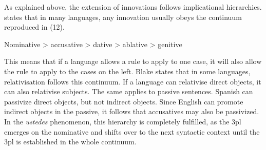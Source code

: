 \documentclass[output=paper]{LSP/langsci}
\begin{document}
\begin{table}
\label{tab:10}
\caption{Extension of the innovative 3pl in the \textit{ustedes} phenomenon} 
\end{table}

As explained above, the extension of innovations follows implicational hierarchies. \citet{blake_case_2004} states that in many languages, any innovation usually obeys the continuum reproduced in (12).

\begin{exe}
\ex Nominative {\textgreater} accusative {\textgreater} dative {\textgreater} ablative {\textgreater} genitive
\end{exe}

This means that if a language allows a rule to apply to one case, it will also allow the rule to apply to the cases on the left. Blake states that in some languages, relativisation follows this continuum. If a language can relativise direct objects, it can also relativise subjects. The same applies to passive sentences. Spanish can passivize direct objects, but not indirect objects. Since English can promote indirect objects in the passive, it follows that accusatives may also be passivized. In the \textit{ustedes} phenomenon, this hierarchy is completely fulfilled, as the 3pl emerges on the nominative and shifts over to the next syntactic context until the 3pl is established in the whole continuum.
\end{document}
